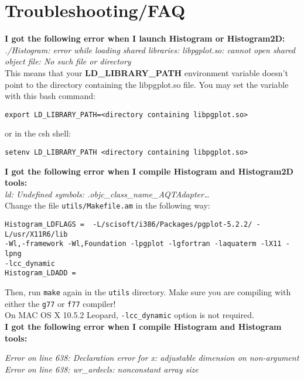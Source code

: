 \section{Troubleshooting/FAQ}

\textbf{I got the following error when I launch Histogram or Histogram2D:}\\

\textit{./Histogram: error while loading shared libraries: libpgplot.so: cannot
open shared object file: No such file or directory}\\

This means that your \textbf{LD\_LIBRARY\_PATH} environment variable doesn't
point to the directory containing the libpgplot.so file. You may set the
variable with this bash command: 
\begin{verbatim}
export LD_LIBRARY_PATH=<directory containing libpgplot.so>
\end{verbatim}
or in the csh shell:
\begin{verbatim}
setenv LD_LIBRARY_PATH <directory containing libpgplot.so> 
\end{verbatim}

\textbf{I got the following error when I compile Histogram and Histogram2D
tools:}\\ 
\textit{ld: Undefined symbols: .objc\_class\_name\_AQTAdapter\ldots}\\

Change the file \verb+utils/Makefile.am+ in the following way:
\begin{verbatim}
Histogram_LDFLAGS =  -L/scisoft/i386/Packages/pgplot-5.2.2/ -L/usr/X11R6/lib 
-Wl,-framework -Wl,Foundation -lpgplot -lgfortran -laquaterm -lX11 -lpng 
-lcc_dynamic 
Histogram_LDADD =
\end{verbatim}
Then, run \verb+make+ again in the \verb+utils+ directory. 
Make sure you are compiling with either the 
\texttt{g77} or \texttt{f77} compiler! \\
On MAC OS X 10.5.2 Leopard, \verb+-lcc_dynamic+ option is not
required.\\

\textbf{I got the following error when I compile Histogram and
Histogram tools:}

\noindent
\textit{Error on line 638: Declaration error for x: adjustable dimension on
non-argument\\}
\textit{Error on line 638: wr\_ardecls:  nonconstant array size\\ }

